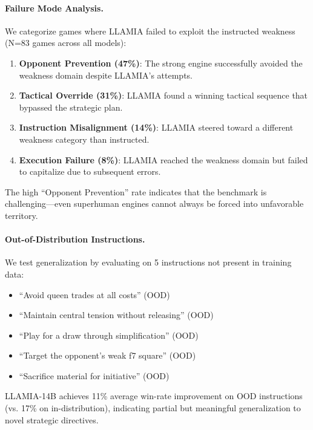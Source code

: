 \paragraph{Failure Mode Analysis.}
We categorize games where LLAMIA failed to exploit the instructed weakness (N=83 games across all models):
\begin{enumerate}
    \item \textbf{Opponent Prevention (47\%)}: The strong engine successfully avoided the weakness domain despite LLAMIA's attempts.
    \item \textbf{Tactical Override (31\%)}: LLAMIA found a winning tactical sequence that bypassed the strategic plan.
    \item \textbf{Instruction Misalignment (14\%)}: LLAMIA steered toward a different weakness category than instructed.
    \item \textbf{Execution Failure (8\%)}: LLAMIA reached the weakness domain but failed to capitalize due to subsequent errors.
\end{enumerate}
The high ``Opponent Prevention'' rate indicates that the benchmark is challenging---even superhuman engines cannot always be forced into unfavorable territory.

\paragraph{Out-of-Distribution Instructions.}
We test generalization by evaluating on 5 instructions not present in training data:
\begin{itemize}
    \item ``Avoid queen trades at all costs'' (OOD)
    \item ``Maintain central tension without releasing'' (OOD)
    \item ``Play for a draw through simplification'' (OOD)
    \item ``Target the opponent's weak f7 square'' (OOD)
    \item ``Sacrifice material for initiative'' (OOD)
\end{itemize}
LLAMIA-14B achieves 11\% average win-rate improvement on OOD instructions (vs. 17\% on in-distribution), indicating partial but meaningful generalization to novel strategic directives.


